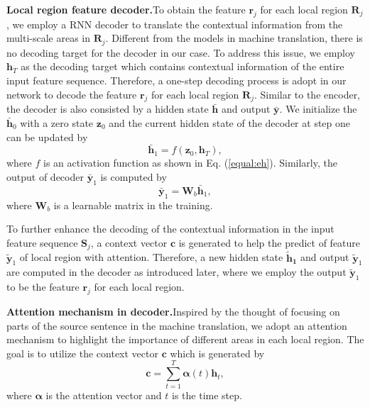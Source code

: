 \documentclass[letterpaper]{article}
\begin{document}
\noindent
\newline
\textbf{Local region feature decoder.}\quad To obtain the feature $\bm{r}_j$ for each local region $\bm{R}_j$, we employ a RNN decoder to translate the contextual information from the multi-scale areas in $\bm{R}_j$. 
Different from the models in machine translation, there is no decoding target for the decoder in our case.
To address this issue, we employ $\mathbf{h}_T$ as the decoding target which contains contextual information of the entire input feature sequence.
Therefore, a one-step decoding process is adopt in our network to decode the feature $\bm{r}_j$ for each local region $\bm{R}_j$.
Similar to the encoder, the decoder is also consisted by a hidden state $\mathbf{\bar{h}}$ and output $\mathbf{\bar{y}}$.
We initialize the $\mathbf{\bar{h}}_0$ with a zero state $\mathbf{z}_0$ and the current hidden state of the decoder at step one can be updated by
\begin{equation}
\mathbf{\bar{h}}_1 = f(\mathbf{z}_0, \mathbf{h}_T),
\end{equation}
where $f$ is an activation function as shown in Eq. (\ref{equal:eh}).
Similarly, the output of decoder $\mathbf{\bar{y}}_1$ is computed by
\begin{equation}
\mathbf{\bar{y}}_1 = \mathbf{W}_b \mathbf{\bar{h}}_1,
\end{equation}
where $\mathbf{W}_b$ is a learnable matrix in the training.

To further enhance the decoding of the contextual information in the input feature sequence $\bm{S}_j$, a context vector $\mathbf{c}$ is generated to help the predict of feature $\mathbf{\tilde{y}}_1$ of local region with attention. Therefore, a new hidden state $\mathbf{\tilde{h}_1}$ and output $\mathbf{\tilde{y}}_1$ are computed in the decoder as introduced later, where we employ the output $\mathbf{\tilde{y}}_1$ to be the feature $\bm{r}_j$ for each local region. 





\noindent
\newline
\textbf{Attention mechanism in decoder.}\quad Inspired by the thought of focusing on parts of the source sentence in the machine translation, we adopt an attention mechanism to highlight the importance of different areas in each local region.
The goal is to utilize the context vector $\mathbf{c}$ which is generated by
\begin{equation}
\mathbf{c} = {\sum}^T_{t=1}{\bm{\alpha}(t)\mathbf{h}_t},
\label{equal:context}
\end{equation}
where $\bm{\alpha}$ is the attention vector and $t$ is the time step.
\end{document}

